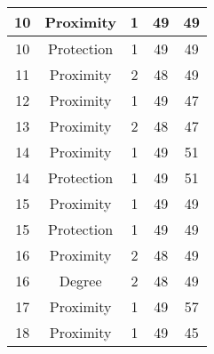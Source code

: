 \documentclass[results.tex]{subfiles}
\begin{document}
\begin{center}
\begin{tabular}{| c || c | c | c | c |}
            \hline
            10                      & Proximity                    & 1                      & 49                      & 49                   \\
            \hline
            10                      & Protection                   & 1                      & 49                      & 49                   \\
            \hline
            11                      & Proximity                    & 2                      & 48                      & 49                   \\
            \hline
            12                      & Proximity                    & 1                      & 49                      & 47                   \\
            \hline
            13                      & Proximity                    & 2                      & 48                      & 47                   \\
            \hline
            14                      & Proximity                    & 1                      & 49                      & 51                   \\
            \hline
            14                      & Protection                   & 1                      & 49                      & 51                   \\
            \hline
            15                      & Proximity                    & 1                      & 49                      & 49                   \\
            \hline
            15                      & Protection                   & 1                      & 49                      & 49                   \\
            \hline
            16                      & Proximity                    & 2                      & 48                      & 49                   \\
            \hline
            16                      & Degree                       & 2                      & 48                      & 49                   \\
            \hline
            17                      & Proximity                    & 1                      & 49                      & 57                   \\
            \hline
            18                      & Proximity                    & 1                      & 49                      & 45                   \\

\end{tabular}
\end{center}
\end{document}
